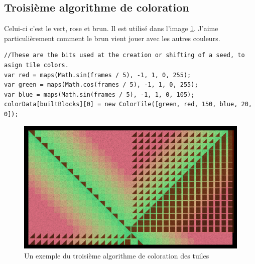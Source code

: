 \subsection{Troisième algorithme de coloration}
Celui-ci c'est le vert, rose et brun. Il est utilisé dans l'image \ref{thirdcoloralgorithm}. J'aime particulièrement comment le brun vient jouer avec les autres couleurs.
\begin{lstlisting}
//These are the bits used at the creation or shifting of a seed, to asign tile colors.
var red = maps(Math.sin(frames / 5), -1, 1, 0, 255);
var green = maps(Math.cos(frames / 5), -1, 1, 0, 255);
var blue = maps(Math.sin(frames / 5), -1, 1, 0, 105);
colorData[builtBlocks][0] = new ColorTile([green, red, 150, blue, 20, 0]);
\end{lstlisting}

\begin{figure}[h]
\includegraphics[width=1\textwidth]{images/pavage004.jpg}
\caption{Un exemple du troisième algorithme de coloration des tuiles}
\label{thirdcoloralgorithm}
\end{figure}
